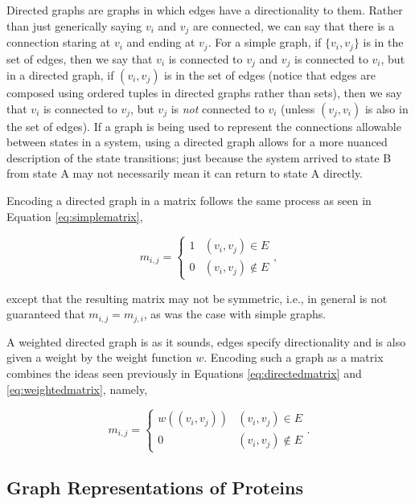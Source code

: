 Directed graphs are graphs in which edges have a directionality to them. Rather than just generically saying \(v_{i}\) and \(v_{j}\) are connected, we can say that there is a connection staring at \(v_{i}\) and ending at \(v_{j}\). For a simple graph, if \(\{v_{i}, v_{j}\}\) is in the set of edges, then we say that \(v_{i}\) is connected to \(v_{j}\) and \(v_{j}\) is connected to \(v_{i}\), but in a directed graph, if \((v_{i}, v_{j})\) is in the set of edges (notice that edges are composed using ordered tuples in directed graphs rather than sets), then we say that \(v_{i}\) is connected to \(v_{j}\), but \(v_{j}\) is \textit{not} connected to \(v_{i}\) (unless \((v_{j}, v_{i})\) is also in the set of edges). If a graph is being used to represent the connections allowable between states in a system, using a directed graph allows for a more nuanced description of the state transitions; just because the system arrived to state B from state A may not necessarily mean it can return to state A directly.

Encoding a directed graph in a matrix follows the same process as seen in Equation \ref{eq:simplematrix},

\begin{equation}
 m_{i, j} = \begin{cases}
1 & (v_{i}, v_{j}) \in E\\
0 & (v_{i}, v_{j}) \not\in E
\end{cases},\label{eq:directedmatrix}
\end{equation}

\noindent except that the resulting matrix may not be symmetric, i.e., in general is not guaranteed that \(m_{i, j} = m_{j, i}\), as was the case with simple graphs.

A weighted directed graph is as it sounds, edges specify directionality and is also given a weight by the weight function \(w\). Encoding such a graph as a matrix combines the ideas seen previously in Equations \ref{eq:directedmatrix} and \ref{eq:weightedmatrix}, namely,

\begin{equation}
 m_{i, j} = \begin{cases}
w((v_{i}, v_{j})) & (v_{i}, v_{j}) \in E\\
0 & (v_{i}, v_{j}) \not\in E
\end{cases}.
\end{equation}

\subsection{Graph Representations of Proteins}

